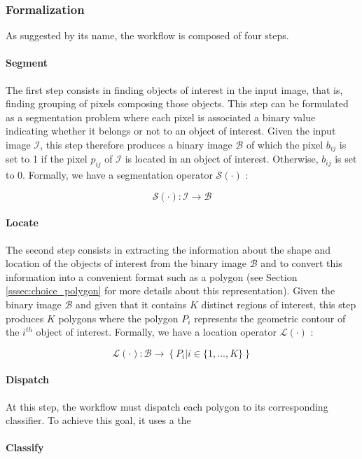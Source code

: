 \subsubsection{Formalization}
As suggested by its name, the workflow is composed of four steps. 

\paragraph{Segment} The first step consists in finding objects of interest in the input image, that is, finding grouping of pixels composing those objects. This step can be formulated as a segmentation problem where each pixel is associated a binary value indicating whether it belongs or not to an object of interest. Given the input image $\mathcal{I}$, this step therefore produces a binary image $\mathcal{B}$ of which the pixel $b_{ij}$ is set to 1 if the pixel $p_{ij}$ of $\mathcal{I}$ is located in an object of interest. Otherwise, $b_{ij}$ is set to 0. Formally, we have a segmentation operator $\mathcal{S}(\cdot)$ : 

\[
	\mathcal{S}(\cdot) : \mathcal{I} \rightarrow \mathcal{B}
\]

\paragraph{Locate} The second step consists in extracting the information about the shape and location of the objects of interest from the binary image $\mathcal{B}$ and to convert this information into a convenient format such as a polygon (see Section \ref{sssec:choice_polygon} for more details about this representation). Given the binary image $\mathcal{B}$ and given that it contains $K$ distinct regions of interest, this step produces $K$ polygons where the polygon $P_i$ represents the geometric contour of the $i^{th}$ object of interest. Formally, we have a location operator $\mathcal{L}(\cdot)$ : 

\[
	\mathcal{L}(\cdot) : \mathcal{B} \rightarrow \left\{P_i | i \in \{1,...,K\}\right\}
\]

\paragraph{Dispatch} At this step, the workflow must dispatch each polygon to its corresponding classifier. To achieve this goal, it uses a  the 

\paragraph{Classify}
 

